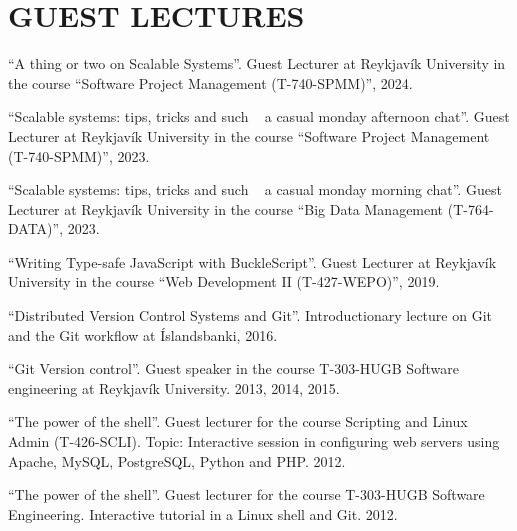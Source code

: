 \section{GUEST LECTURES}
``A thing or two on Scalable Systems''. Guest Lecturer at Reykjavík University in the course ``Software Project Management (T-740-SPMM)'', 2024.

``Scalable systems: tips, tricks and such ~ a casual monday afternoon chat''. Guest Lecturer at Reykjavík University in the course ``Software Project Management (T-740-SPMM)'', 2023.

``Scalable systems: tips, tricks and such ~ a casual monday morning chat''. Guest Lecturer at Reykjavík University in the course ``Big Data Management (T-764-DATA)'', 2023.

``Writing Type-safe JavaScript with BuckleScript''. Guest Lecturer at Reykjavík University in the course ``Web Development II (T-427-WEPO)'', 2019.

``Distributed Version Control Systems and Git''. Introductionary lecture on Git and the Git workflow at Íslandsbanki, 2016.

``Git Version control''. Guest speaker in the course T-303-HUGB Software engineering at Reykjavík University. 2013, 2014, 2015.

``The power of the shell''. Guest lecturer for the course Scripting and Linux Admin (T-426-SCLI). Topic: Interactive session in configuring web servers using Apache, MySQL, PostgreSQL, Python and PHP. 2012.

``The power of the shell''. Guest lecturer for the course T-303-HUGB Software Engineering. Interactive tutorial in a Linux shell and Git. 2012.
